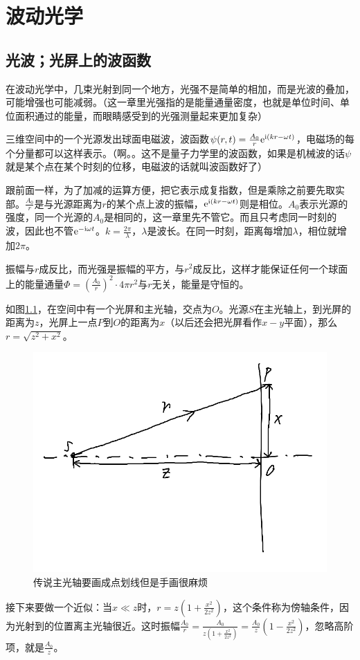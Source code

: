 \chapter{波动光学}
\section{光波；光屏上的波函数}
在波动光学中，几束光射到同一个地方，光强不是简单的相加，而是光波的叠加，可能增强也可能减弱。（这一章里光强指的是能量通量密度，也就是单位时间、单位面积通过的能量，而眼睛感受到的光强测量起来更加复杂）

三维空间中的一个光源发出球面电磁波，波函数$\psi(r,t)=\frac{A_0}{r} \mathrm{e}^{\mathrm{i}(k r-\omega t)}$，电磁场的每个分量都可以这样表示。（啊。。这不是量子力学里的波函数，如果是机械波的话$\psi$就是某个点在某个时刻的位移，电磁波的话就叫波函数好了）

跟前面一样，为了加减的运算方便，把它表示成复指数，但是乘除之前要先取实部。$\frac{A_0}{r}$是与光源距离为$r$的某个点上波的振幅，$\mathrm{e}^{\mathrm{i}(k r-\omega t)}$则是相位。$A_0$表示光源的强度，同一个光源的$A_0$是相同的，这一章里先不管它。而且只考虑同一时刻的波，因此也不管$\mathrm{e}^{-\mathrm{i} \omega t}$。$k=\frac{2 \pi}{\lambda}$，$\lambda$是波长。在同一时刻，距离每增加$\lambda$，相位就增加$2 \pi$。

振幅与$r$成反比，而光强是振幅的平方，与$r^2$成反比，这样才能保证任何一个球面上的能量通量$\Phi=(\frac{A_0}{r})^2 \cdot 4 \pi r^2$与$r$无关，能量是守恒的。

如图\ref{fig-wave-amp}，在空间中有一个光屏和主光轴，交点为$O$。光源$S$在主光轴上，到光屏的距离为$z$，光屏上一点$P$到$O$的距离为$x$（以后还会把光屏看作$x-y$平面），那么$r=\sqrt{z^2+x^2}$。
\begin{figure}[htb]
\centering
\includegraphics[width=0.33\linewidth]{fig/wave-amp.png}
\caption{传说主光轴要画成点划线但是手画很麻烦}
\label{fig-wave-amp}
\end{figure}

接下来要做一个近似：当$x \ll z$时，$r=z (1+\frac{x^2}{2 z^2})$，这个条件称为傍轴条件，因为光射到的位置离主光轴很近。这时振幅$\frac{A_0}{r}=\frac{A_0}{z (1+\frac{x^2}{2 z^2})}=\frac{A_0}{z}(1-\frac{x^2}{2 z^2})$，忽略高阶项，就是$\frac{A_0}{z}$。

